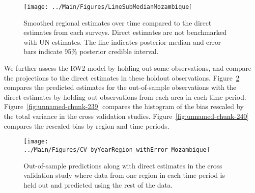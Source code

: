 \documentclass[12pt]{article}\usepackage[]{graphicx}\usepackage[]{color}
\newenvironment{knitrout}{}{} %
\begin{document}
\begin{knitrout}
\color{fgcolor}\begin{figure}[bht]

{\centering \texttt{[image: ../Main/Figures/LineSubMedianMozambique]} 

}

\caption[Smoothed regional estimates over time compared to the direct estimates from each surveys]{Smoothed regional estimates over time compared to the direct estimates from each surveys. Direct estimates are not benchmarked with UN estimates. The line indicates posterior median and error bars indicate 95\% posterior credible interval.}\label{fig:unnamed-chunk-237}
\end{figure}


\end{knitrout}
We further assess the RW2 model by holding out some observations, and compare the projections to the direct estimates in these holdout observations. Figure~\ref{fig:unnamed-chunk-238} compares the predicted estimates for the out-of-sample observations  with the direct estimates by holding out observations from each area in each time period.  Figure~\ref{fig:unnamed-chunk-239} compares the histogram of the bias rescaled by the total variance in the cross validation studies. Figure~\ref{fig:unnamed-chunk-240} compares the rescaled bias by region and time periods.



 
\begin{knitrout}
\color{fgcolor}\begin{figure}[bht]

{\centering \texttt{[image: ../Main/Figures/CV\_byYearRegion\_withError\_Mozambique]} 

}

\caption[Out-of-sample predictions along with direct estimates in the cross validation study where data from one region in each time period is held out and predicted using the rest of the data]{Out-of-sample predictions along with direct estimates in the cross validation study where data from one region in each time period is held out and predicted using the rest of the data.}\label{fig:unnamed-chunk-238}
\end{figure}


\end{knitrout}
\end{document}
